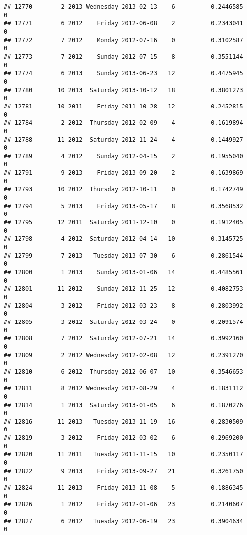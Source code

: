 \documentclass[
]{article}
\begin{document}
\begin{verbatim}
## 12770        2 2013 Wednesday 2013-02-13    6          0.2446585             0
## 12771        6 2012    Friday 2012-06-08    2          0.2343041             0
## 12772        7 2012    Monday 2012-07-16    0          0.3102587             0
## 12773        7 2012    Sunday 2012-07-15    8          0.3551144             0
## 12774        6 2013    Sunday 2013-06-23   12          0.4475945             0
## 12780       10 2013  Saturday 2013-10-12   18          0.3801273             0
## 12781       10 2011    Friday 2011-10-28   12          0.2452815             0
## 12784        2 2012  Thursday 2012-02-09    4          0.1619894             0
## 12788       11 2012  Saturday 2012-11-24    4          0.1449927             0
## 12789        4 2012    Sunday 2012-04-15    2          0.1955040             0
## 12791        9 2013    Friday 2013-09-20    2          0.1639869             0
## 12793       10 2012  Thursday 2012-10-11    0          0.1742749             0
## 12794        5 2013    Friday 2013-05-17    8          0.3568532             0
## 12795       12 2011  Saturday 2011-12-10    0          0.1912405             0
## 12798        4 2012  Saturday 2012-04-14   10          0.3145725             0
## 12799        7 2013   Tuesday 2013-07-30    6          0.2861544             0
## 12800        1 2013    Sunday 2013-01-06   14          0.4485561             0
## 12801       11 2012    Sunday 2012-11-25   12          0.4082753             0
## 12804        3 2012    Friday 2012-03-23    8          0.2803992             0
## 12805        3 2012  Saturday 2012-03-24    0          0.2091574             0
## 12808        7 2012  Saturday 2012-07-21   14          0.3992160             0
## 12809        2 2012 Wednesday 2012-02-08   12          0.2391270             0
## 12810        6 2012  Thursday 2012-06-07   10          0.3546653             0
## 12811        8 2012 Wednesday 2012-08-29    4          0.1831112             0
## 12814        1 2013  Saturday 2013-01-05    6          0.1870276             0
## 12816       11 2013   Tuesday 2013-11-19   16          0.2830509             0
## 12819        3 2012    Friday 2012-03-02    6          0.2969200             0
## 12820       11 2011   Tuesday 2011-11-15   10          0.2350117             0
## 12822        9 2013    Friday 2013-09-27   21          0.3261750             0
## 12824       11 2013    Friday 2013-11-08    5          0.1886345             0
## 12826        1 2012    Friday 2012-01-06   23          0.2140607             0
## 12827        6 2012   Tuesday 2012-06-19   23          0.3904634             0

\end{verbatim}
\end{document}
